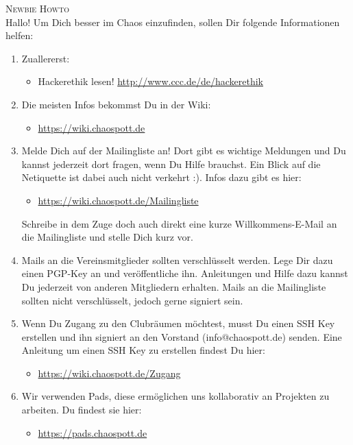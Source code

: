
\pagestyle{empty}

	\textsc{\huge Newbie Howto}\\[0.5cm]
	Hallo!
	\newline
	Um Dich besser im Chaos einzufinden, sollen Dir folgende Informationen helfen:
	\begin{enumerate}
	\item Zuallererst:
		\begin{itemize}
		  \item Hackerethik lesen! \url{http://www.ccc.de/de/hackerethik}
		\end{itemize}
	\item Die meisten Infos bekommst Du in der Wiki: 
		\begin{itemize}
		  \item \url{https://wiki.chaospott.de}
		\end{itemize}
	\item Melde Dich auf der Mailingliste an! Dort gibt es wichtige Meldungen und Du kannst jederzeit dort fragen, wenn Du Hilfe brauchst. Ein Blick auf die Netiquette ist dabei auch nicht verkehrt :). Infos dazu gibt es hier:
		\begin{itemize}
		  \item \url{https://wiki.chaospott.de/Mailingliste}
		\end{itemize}
		Schreibe in dem Zuge doch auch direkt eine kurze Willkommens-E-Mail an die Mailingliste und stelle Dich kurz vor.
	\item Mails an die Vereinsmitglieder sollten verschlüsselt werden. Lege Dir dazu einen PGP-Key an und veröffentliche ihn. Anleitungen und Hilfe dazu kannst Du jederzeit von anderen Mitgliedern erhalten. Mails an die Mailingliste sollten nicht verschlüsselt, jedoch gerne signiert sein.
	\item Wenn Du Zugang zu den Clubräumen möchtest, musst Du einen SSH Key erstellen und ihn signiert an den Vorstand (info@chaospott.de) senden. Eine Anleitung um einen SSH Key zu erstellen findest Du hier: 
		\begin{itemize}
		  \item \url{https://wiki.chaospott.de/Zugang}
		\end{itemize}
	\item Wir verwenden Pads, diese ermöglichen uns kollaborativ an Projekten zu arbeiten. Du findest sie hier:
		\begin{itemize}
		  \item \url{https://pads.chaospott.de}
		\end{itemize}

\end{enumerate}
